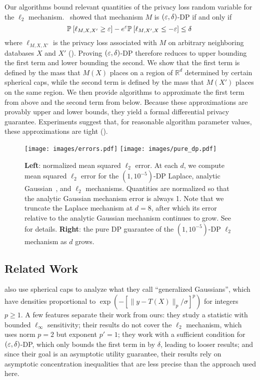 Our algorithms bound relevant quantities of the privacy loss random variable for the $\ell_2$ mechanism.~\citet{BW18} showed that mechanism $M$ is $(\varepsilon, \delta)$-DP if and only if
\begin{equation}
\label{eq:iff}
    \mathbb{P}_{}\left[\ell_{M,X,X'} \geq \varepsilon\right] - e^\varepsilon\mathbb{P}_{}\left[\ell_{M,X',X}  \leq -\varepsilon\right] \leq \delta~
\end{equation}
where $\ell_{M,X,X'}$ is the privacy loss associated with $M$ on arbitrary neighboring databases $X$ and $X'$ (). Proving $(\varepsilon,\delta)$-DP therefore reduces to upper bounding the first term and lower bounding the second. We show that the first term is defined by the mass that $M(X)$ places on a region of $\mathbb{R}^d$ determined by certain spherical caps, while the second term is defined by the mass that $M(X')$ places on the same region. We then provide algorithms to approximate the first term from above and the second term from below. Because these approximations are provably upper and lower bounds, they yield a formal differential privacy guarantee. Experiments suggest that, for reasonable algorithm parameter values, these approximations are tight ().

\begin{figure*}[t]
        \centering
        \texttt{[image: images/errors.pdf]}
        \texttt{[image: images/pure\_dp.pdf]}
        \caption{\textbf{Left}: normalized mean squared $\ell_2$ error. At each $d$, we compute mean squared $\ell_2$ error for the $(1, 10^{-5})$-DP Laplace, analytic Gaussian~\cite{BW18}, and $\ell_2$ mechanisms. Quantities are normalized so that the analytic Gaussian mechanism error is always 1. Note that we truncate the Laplace mechanism at $d=8$, after which its error relative to the analytic Gaussian mechanism continues to grow. See  for details. \textbf{Right}: the pure DP guarantee of the $(1, 10^{-5})$-DP $\ell_2$ mechanism as $d$ grows.}
        \label{fig:intro}
\end{figure*}

\subsection{Related Work}
\citet{GZ21} also use spherical caps to analyze what they call ``generalized Gaussians'', which have densities proportional to $\exp(-[\|y - T(X)\|_p / \sigma]^p)$ for integers $p \geq 1$. A few features separate their work from ours: they study a statistic with bounded $\ell_\infty$ sensitivity; their results do not cover the $\ell_2$ mechanism, which uses norm $p=2$ but exponent $p'=1$; they work with a sufficient condition for $(\varepsilon, \delta)$-DP, which only bounds the first term in  by $\delta$, leading to looser results; and since their goal is an asymptotic utility guarantee, their results rely on asymptotic concentration inequalities that are less precise than the approach used here.

